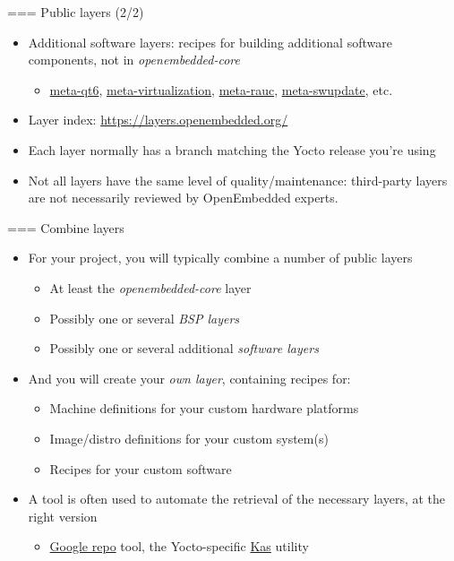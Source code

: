 === {Public layers (2/2)}
  \begin{itemize}
  \item Additional software layers: recipes for building additional
    software components, not in {\em openembedded-core}
    \begin{itemize}
    \item
      \href{https://code.qt.io/cgit/yocto/meta-qt6.git/}{meta-qt6},
      \href{https://git.yoctoproject.org/meta-virtualization}{meta-virtualization},
      \href{https://github.com/rauc/meta-rauc}{meta-rauc},
      \href{https://github.com/sbabic/meta-swupdate}{meta-swupdate},
      etc.
    \end{itemize}
  \item Layer index: \url{https://layers.openembedded.org/}
  \item Each layer normally has a branch matching the Yocto release
    you're using
  \item Not all layers have the same level of quality/maintenance:
    third-party layers are not necessarily reviewed by OpenEmbedded
    experts.
  \end{itemize}


=== {Combine layers}
  \begin{itemize}
  \item For your project, you will typically combine a number of
    public layers
    \begin{itemize}
    \item At least the {\em openembedded-core} layer
    \item Possibly one or several {\em BSP layers}
    \item Possibly one or several additional {\em software layers}
    \end{itemize}
  \item And you will create your {\em own layer}, containing recipes
    for:
    \begin{itemize}
    \item Machine definitions for your custom hardware platforms
    \item Image/distro definitions for your custom system(s)
    \item Recipes for your custom software
    \end{itemize}
  \item A tool is often used to automate the retrieval of the
    necessary layers, at the right version
    \begin{itemize}
    \item \href{https://gerrit.googlesource.com/git-repo/}{Google
        repo} tool, the Yocto-specific
      \href{https://kas.readthedocs.io}{Kas} utility
    \end{itemize}
  \end{itemize}


